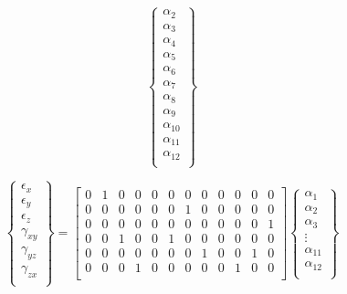 \begin{equation}
\begin{Bmatrix}
        \alpha_{2} \\
        \alpha_{3} \\
        \alpha_{4} \\
        \alpha_{5} \\
        \alpha_{6} \\
        \alpha_{7} \\
        \alpha_{8} \\
        \alpha_{9} \\
        \alpha_{10} \\
        \alpha_{11} \\
        \alpha_{12} \\
    \end{Bmatrix}
\end{equation}

\begin{equation} \label{eq:matrixalphadisplacement}
    \begin{Bmatrix}
        \epsilon_{x} \\
        \epsilon_{y} \\
        \epsilon_{z} \\
        \gamma_{xy} \\
        \gamma_{yz} \\
        \gamma_{zx} \\
    \end{Bmatrix}
    = 
    \begin{bmatrix}
    0 & 1 & 0 & 0 & 0 & 0 & 0 & 0 & 0 & 0 & 0 & 0 \\
    0 & 0 & 0 & 0 & 0 & 0 & 1 & 0 & 0 & 0 & 0 & 0 \\
    0 & 0 & 0 & 0 & 0 & 0 & 0 & 0 & 0 & 0 & 0 & 1 \\
    0 & 0 & 1 & 0 & 0 & 1 & 0 & 0 & 0 & 0 & 0 & 0 \\
    0 & 0 & 0 & 0 & 0 & 0 & 0 & 1 & 0 & 0 & 1 & 0 \\
    0 & 0 & 0 & 1 & 0 & 0 & 0 & 0 & 0 & 1 & 0 & 0 \\
    \end{bmatrix}
    \begin{Bmatrix}
        \alpha_{1} \\
        \alpha_{2} \\
        \alpha_{3} \\
        \vdots \\
        \alpha_{11} \\
        \alpha_{12} \\
    \end{Bmatrix}
\end{equation}

